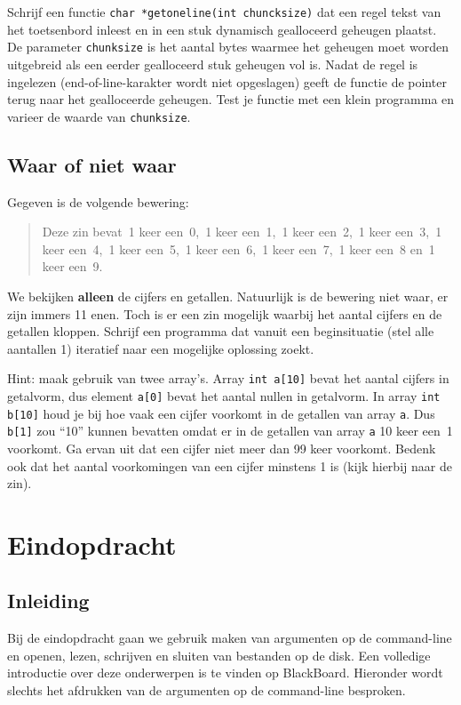 \documentclass[a4paper,10pt,fleqn,twoside]{article}
\begin{document}
Schrijf een functie \lstinline|char *getoneline(int chuncksize)| dat een regel tekst van het toetsenbord inleest en in een stuk dynamisch gealloceerd geheugen plaatst. De parameter \lstinline|chunksize| is het aantal bytes waarmee het geheugen moet worden uitgebreid als een eerder gealloceerd stuk geheugen vol is. Nadat de regel is ingelezen (end-of-line-karakter wordt niet opgeslagen) geeft de functie de pointer terug naar het gealloceerde geheugen. Test je functie met een klein programma en varieer de waarde van \lstinline|chunksize|.

\subsection{Waar of niet waar}
Gegeven is de volgende bewering:
\begin{quote}
Deze zin bevat~1 keer een~0,~1 keer een~1,~1 keer een~2,~1 keer een~3,~1 keer een~4,~1 keer een~5,~1 keer een~6,~1 keer een~7,~1 keer een~8 en~1 keer een~9.
\end{quote}

We bekijken \textbf{alleen} de cijfers en getallen. Natuurlijk is de bewering niet waar, er zijn immers 11 enen. Toch is er een zin mogelijk waarbij het aantal cijfers en de getallen kloppen. Schrijf een programma dat vanuit een beginsituatie (stel alle aantallen 1) iteratief naar een mogelijke oplossing zoekt.

Hint: maak gebruik van twee array's. Array \lstinline|int a[10]| bevat het aantal cijfers in getalvorm, dus element \lstinline|a[0]| bevat het aantal nullen in getalvorm. In array \lstinline|int b[10]| houd je bij hoe vaak een cijfer voorkomt in de getallen van array \lstinline|a|. Dus \lstinline|b[1]| zou ``10'' kunnen bevatten omdat er in de getallen van array \lstinline|a| 10 keer een~1 voorkomt. Ga ervan uit dat een cijfer niet meer dan 99 keer voorkomt. Bedenk ook dat het aantal voorkomingen van een cijfer minstens 1 is (kijk hierbij naar de zin).

\section{Eindopdracht}

\subsection{Inleiding}
Bij de eindopdracht gaan we gebruik maken van argumenten op de command-line en openen, lezen, schrijven en sluiten van bestanden op de disk. Een volledige introductie over deze onderwerpen is te vinden op BlackBoard. Hieronder wordt slechts het afdrukken van de argumenten op de command-line besproken.
\end{document}
